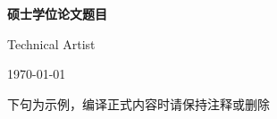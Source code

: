 \documentclass[twoside, 11pt, a4paper]{article}
\begin{document}
\begin{titlepage}
    \vspace*{\fill}
    \begin{center}
        {\sanhao\bfseries 硕士学位论文题目 \par}
        \vspace{2em}
        {\sihao Technical Artist \par}
        \vspace{1em}
        {\sihao \today \par}
    \end{center}
    \vspace*{\fill}
\end{titlepage}

\cleardoublepage
{}


\cleardoublepage
{}
\tableofcontents
\cleardoublepage
\fancyhead[EC]{\headerfont \leftmark}

下句为示例，编译正式内容时请保持注释或删除
% 



\newpage
{}
\printbibliography[heading=bibintoc, title={参考文献}]
\end{document}
